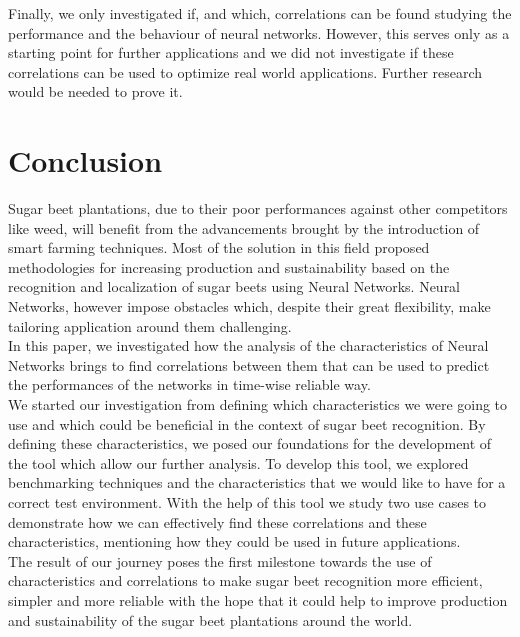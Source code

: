 Finally, we only investigated if, and which, correlations can be found studying the performance and the behaviour of neural networks. However, this serves only as a starting point for further applications and we did not investigate if these correlations can be used to optimize real world applications. Further research would be needed to prove it. 

\section{Conclusion}
Sugar beet plantations, due to their poor performances against other competitors like weed, will benefit from the advancements brought by the introduction of smart farming techniques. Most of the solution in this field proposed methodologies for increasing production and sustainability based on the recognition and localization of sugar beets using Neural Networks. Neural Networks, however impose obstacles which, despite their great flexibility, make tailoring application around them challenging.\\ 
In this paper, we investigated how the analysis of the characteristics of Neural Networks brings to find correlations between them that can be used to predict the performances of the networks in time-wise reliable way.\\
We started our investigation from defining which characteristics we were going to use and which could be beneficial in the context of sugar beet recognition. By defining these characteristics, we posed our foundations for the development of the tool which allow our further analysis. To develop this tool, we explored benchmarking techniques and the characteristics that we would like to have for a correct test environment. With the help of this tool we study two use cases to demonstrate how we can effectively find these correlations and these characteristics, mentioning how they could be used in future applications. \\
The result of our journey poses the first milestone towards the use of characteristics and correlations to make sugar beet recognition more efficient, simpler and more reliable with the hope that it could help to improve production and sustainability of the sugar beet plantations around the world. 